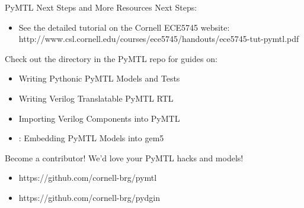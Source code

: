 \begin{frame}{PyMTL Next Steps and More Resources}
Next Steps:
\begin{itemize}
  \item See the detailed tutorial on the Cornell ECE5745 website:
        \footnotesize{http://www.csl.cornell.edu/courses/ece5745/handouts/ece5745-tut-pymtl.pdf}
\end{itemize}

\smallskip
Check out the  directory in the PyMTL repo for guides on:
\begin{itemize}
  \item Writing Pythonic PyMTL Models and Tests
  \item Writing Verilog Translatable PyMTL RTL
  \item Importing Verilog Components into PyMTL
  \item {}: Embedding PyMTL Models into gem5
\end{itemize}

\smallskip
Become a contributor! We'd love your PyMTL hacks and models!
\begin{itemize}
  \item https://github.com/cornell-brg/pymtl
  \item https://github.com/cornell-brg/pydgin
\end{itemize}
\end{frame}

